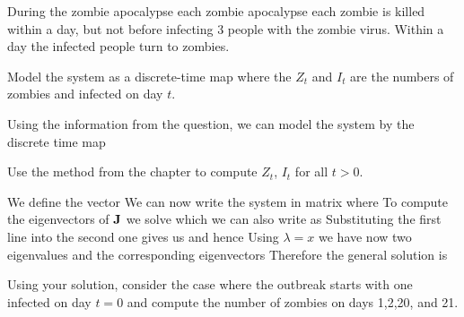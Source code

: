 During the zombie apocalypse each zombie apocalypse each zombie is killed within a day, but not before infecting 3 people with the zombie virus. Within a day the infected people turn to zombies. 

\subquestion Model the system as a discrete-time map where the $Z_t$ and $I_t$ are the numbers of zombies and infected on day $t$.

\solution 
Using the information from the question, we can model the system by the discrete time map

\subquestion Use the method from the chapter to compute $Z_t$,  $I_t$ for all $t>0$.

\solution
We define the vector 
We can now write the system in matrix
where 
To compute the eigenvectors of $\bf J$ we solve 
which we can also write as
Substituting the first line into the second one gives us 
and hence
Using $\lambda=x$ we have now two eigenvalues
and the corresponding eigenvectors 
Therefore the general solution is 

\subquestion Using your solution, consider the case where the outbreak starts with one infected on day $t=0$ and compute the number of zombies on days 1,2,20, and 21.

